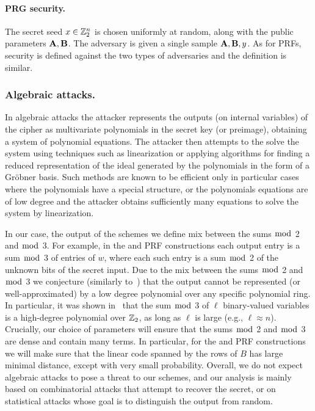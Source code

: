 \paragraph{PRG security.}
The secret seed $x \in \mathbb{Z}_2^n$ is chosen uniformly at random, along with the public parameters $\mat{A},\mat{B}$.
The adversary is given a single sample $\mat{A},\mat{B},y$.
As for PRFs, security is defined against the two types of adversaries and the definition is similar.

\subsubsection{Algebraic attacks.}
In algebraic attacks the attacker represents the outputs (on internal variables) of the cipher as multivariate polynomials in the secret key (or preimage), obtaining a system of polynomial equations. The attacker then attempts to the solve the system using techniques such as linearization or applying algorithms for finding a reduced representation of the ideal generated by the polynomials in the form of a Gr\"{o}bner basis.
Such methods are known to be efficient only in particular cases where the polynomials have a special structure, or the
polynomials equations are of low degree and the attacker obtains sufficiently many equations to solve the system by linearization.

In our case, the output of the schemes we define
mix between the sums $\bmod$ 2 and $\bmod$ 3.
For example, in the \ttOWF and PRF constructions each output entry is a sum $\bmod$ 3 of entries of $w$,
where each such entry is a sum $\bmod$ 2 of the unknown bits of the secret input.
Due to the mix between the sums $\bmod$ 2 and $\bmod$ 3 we conjecture (similarly to~\cite{boneh2018-darkmatter}) that
the output cannot be represented (or well-approximated) by a low degree polynomial over any specific polynomial ring.
In particular, it was shown in~\cite{boneh2018-darkmatter} that the sum $\bmod$ 3 of $\ell$ binary-valued variables is
a high-degree polynomial over $\mathbb{Z}_2$,
as long as $\ell$ is large (e.g., $\ell \approx n$).
Crucially, our choice of parameters will ensure that the sums $\bmod$ 2 and $\bmod$ 3
are dense and contain many terms.
In particular, for the
\ttOWF and PRF constructions
we will make sure that the linear code spanned by the rows of $B$ has large minimal distance,
except with very small probability.
Overall, we do not expect algebraic attacks to pose a threat to our schemes,
and our analysis is mainly based on combinatorial attacks that attempt to recover the secret,
or on statistical attacks whose goal is to distinguish the output from random.


